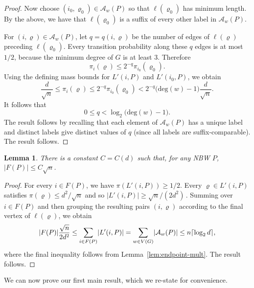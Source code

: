 \documentclass[11pt,a4paper]{article}
\theoremstyle{plain}
\newtheorem{lemma}[theorem]{Lemma}
\def\deg{\mathrm{deg}}
\let\rho=\varrho
\begin{document}
\begin{proof}
Now choose $(i_0,\rho_0)\in\mathcal A_w(P)$ so that
$\ell(\rho_0)$ has minimum length. By the above, we have that $\ell(\rho_0)$ is a suffix of every other label
in $\mathcal A_w(P)$.

For $(i,\rho)\in\mathcal A_w(P)$, let $q=q(i,\rho)$ be the
number of edges of $\ell(\rho)$ preceding 
$\ell(\rho_0)$. Every transition probability along these $q$ edges
is at most $1/2$, because the minimum degree of $G$ is at least $3$.
Therefore
\[
\pi_i(\rho)
\le
2^{-q}\pi_{i_0}(\rho_0).
\]
Using the defining mass bounds for $L'(i,P)$ and
$L'(i_0,P)$, we obtain
\[
\frac{d}{\sqrt n}
\le
\pi_i(\rho)
\le
2^{-q}\pi_{i_0}(\rho_0)
<
2^{-q}\bigl(\deg(w)-1\bigr)\frac{d}{\sqrt n}.
\]
It follows that
\[
0\le q<
\log_2\bigl(\deg(w)-1\bigr).
\]
The result follows by recalling that each element of $\mathcal{A}_w(P)$ has a unique label and distinct labels give distinct values of $q$ (since all labels are suffix-comparable). The result follows. 
\end{proof}

\begin{lemma}\label{lem:disjoint} 
There is a constant $C=C(d)$ such that, 
for any NBW $P$, $|F(P)| \leq  C \sqrt{n}$.
\end{lemma}

\begin{proof}
For every $i\in F(P)$, we have
\(
\pi(L'(i,P))
\ge
1/2.
\)
Every $\rho\in L'(i,P)$ satisfies
\(
\pi(\rho)
\leq
d^2/\sqrt n
\)
and so 
\(
| L'(i,P) |
\ge
\sqrt n/(2d^2)\, .
\)
Summing over $i\in F(P)$ and then grouping the resulting pairs
$(i,\rho)$ according to the final vertex of $\ell(\rho)$, we
obtain
\[
\lvert F(P)\rvert\frac{\sqrt n}{2d^2}
\le
\sum_{i\in F(P)}\lvert L'(i,P)\rvert\\
=
\sum_{w\in V(G)}\lvert\mathcal A_w(P)\rvert\\
\le
n\lceil\log_2 d\rceil,
\]
where the final inequality follows from
Lemma~\ref{lem:endpoint-mult}. The result follows.
\end{proof}
 


We can now prove our first main result, which we re-state for convenience.
\end{document}
